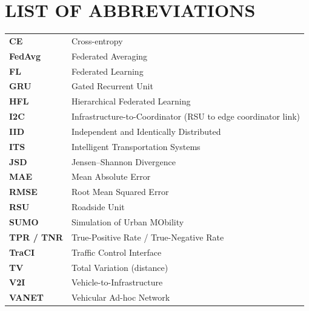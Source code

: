 \chapter*{LIST OF ABBREVIATIONS}
\begin{center}
\renewcommand{\arraystretch}{1.35}
\begin{tabular}{@{}p{3.2cm}p{9.5cm}@{}}
\textbf{CE} & Cross-entropy\\
\textbf{FedAvg} & Federated Averaging\\
\textbf{FL} & Federated Learning\\
\textbf{GRU} & Gated Recurrent Unit\\
\textbf{HFL} & Hierarchical Federated Learning\\
\textbf{I2C} & Infrastructure-to-Coordinator (RSU to edge coordinator link)\\
\textbf{IID} & Independent and Identically Distributed\\
\textbf{ITS} & Intelligent Transportation Systems\\
\textbf{JSD} & Jensen--Shannon Divergence\\
\textbf{MAE} & Mean Absolute Error\\
\textbf{RMSE} & Root Mean Squared Error\\
\textbf{RSU} & Roadside Unit\\
\textbf{SUMO} & Simulation of Urban MObility\\
\textbf{TPR / TNR} & True-Positive Rate / True-Negative Rate\\
\textbf{TraCI} & Traffic Control Interface\\
\textbf{TV} & Total Variation (distance)\\
\textbf{V2I} & Vehicle-to-Infrastructure\\
\textbf{VANET} & Vehicular Ad-hoc Network\\
\end{tabular}
\end{center}
